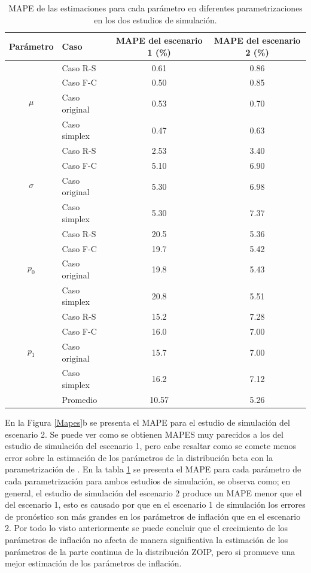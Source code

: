 \begin{table}[!hbt]
{\scriptsize
\begin{center}
\begin{tabular}{|c|l|cc|}\hline
 Par\'{a}metro & Caso & MAPE del escenario 1 (\%) &  MAPE del escenario 2 (\%) \\ \hline

\multirow{4}{*}{$\mu$}&Caso R-S &0.61 & 0.86	\\
& Caso F-C & 0.50	& 0.85	\\
& Caso original &0.53 & 0.70	 \\
& Caso simplex 	&0.47 & 0.63	\\ \hline

\multirow{4}{*}{$\sigma$} &Caso R-S &2.53 & 3.40\\
& Caso F-C 	&5.10 & 6.90\\
& Caso original &5.30 & 6.98\\
& Caso simplex 	&5.30  &7.37 \\\hline

\multirow{4}{*}{$p_0$} &Caso R-S &20.5  & 5.36	\\
& Caso F-C &19.7  & 5.42	\\
& Caso original &19.8 & 5.43	\\
& Caso simplex 	&20.8 & 5.51\\ \hline

\multirow{4}{*}{$p_1$} &Caso R-S 	&15.2 & 7.28\\
& Caso F-C &16.0 & 7.00  \\
& Caso original &15.7	 & 7.00	\\
& Caso simplex &16.2 & 7.12	 \\ \hline
& Promedio & 10.57 & 5.26 \\ \hline
\end{tabular}
\caption{MAPE de las estimaciones para cada par\'{a}metro en diferentes parametrizaciones en los dos estudios de simulaci\'{o}n.}
\label{T_MAPES}
\end{center}
}
\end{table}

En la Figura \ref{Mapes}b se presenta el MAPE para el estudio de simulaci\'{o}n del escenario 2. Se puede ver como se obtienen MAPES muy parecidos a los del estudio de simulaci\'{o}n del escenario 1, pero cabe resaltar como se comete menos error sobre la estimaci\'{o}n de los par\'{a}metros de la distribuci\'{o}n beta con la parametrizaci\'{o}n de \cite{Stasinopoulos2}. En la tabla \ref{T_MAPES} se presenta el MAPE para cada par\'{a}metro de cada parametrizaci\'{o}n para ambos estudios de simulaci\'{o}n, se observa como; en general, el estudio de simulaci\'{o}n del escenario 2 produce un MAPE menor que el del escenario 1, esto es causado por que en el escenario 1 de simulaci\'{o}n los errores de pron\'{o}stico son m\'{a}s grandes en los par\'{a}metros de inflaci\'{o}n que en el escenario 2. Por todo lo visto anteriormente se puede concluir que el crecimiento de los par\'{a}metros de inflaci\'{o}n no afecta de manera significativa la estimaci\'{o}n de los par\'{a}metros de la parte continua de la distribuci\'{o}n ZOIP, pero si promueve una mejor estimaci\'{o}n de los par\'{a}metros de inflaci\'{o}n.


